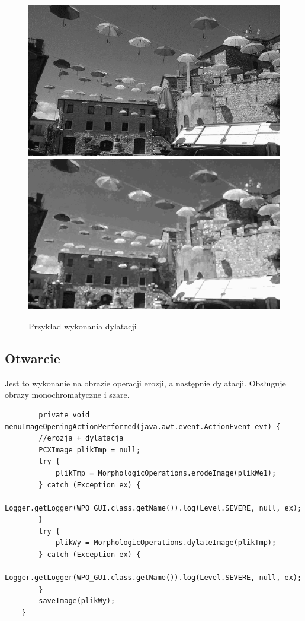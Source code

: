 \documentclass{article}
\begin{document}
\begin{figure}[!ht]
	\includegraphics[scale=1.2]{img/gray-obraz1}
	\includegraphics[scale=0.288]{img/morfologiczne/dylatacja-gray}
	\caption{Przykład wykonania dylatacji}
	\label{fig18}	
	\end{figure}	
	

	\subsection{Otwarcie}
	Jest to wykonanie na obrazie operacji erozji, a następnie dylatacji.
	Obsługuje obrazy monochromatyczne i szare.
	
	\begin{verbatim}
	    private void menuImageOpeningActionPerformed(java.awt.event.ActionEvent evt) {                                                 
        //erozja + dylatacja
        PCXImage plikTmp = null;
        try {
            plikTmp = MorphologicOperations.erodeImage(plikWe1);
        } catch (Exception ex) {
            Logger.getLogger(WPO_GUI.class.getName()).log(Level.SEVERE, null, ex);
        }
        try {
            plikWy = MorphologicOperations.dylateImage(plikTmp);
        } catch (Exception ex) {
            Logger.getLogger(WPO_GUI.class.getName()).log(Level.SEVERE, null, ex);
        }
        saveImage(plikWy);
    }  
	\end{verbatim}
	
\end{document}
